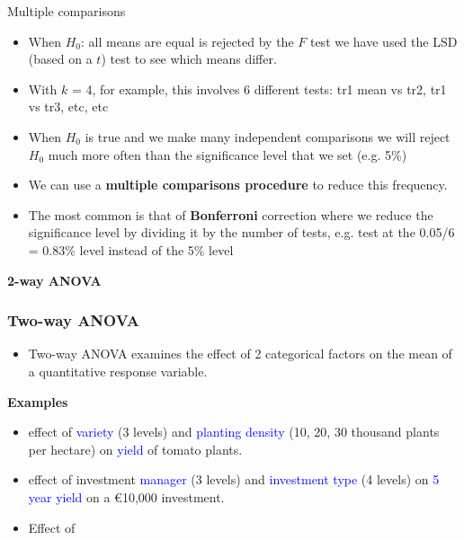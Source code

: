 \documentclass[12pt,xcolor=dvipsnames,handout,mathserif,aspectratio=169]{beamer}
\newcommand{\bbl}[1]{{\color{NavyBlue} \textbf{#1}}}
\newcommand{\bgr}[1]{{\color{PineGreen} \textbf{#1}}}
\newcommand{\tc}{\textcolor}
\begin{document}
\begin{frame}{Multiple comparisons}
\begin{itemize}
\item When $H_0$: all means are equal is rejected by the $F$ test
we have used the LSD (based on a $t$) test to see which means differ.
\vspace{0.2cm}
\item With $k$ = 4, for example, this involves 6 different tests: tr1 mean vs  tr2, tr1 vs tr3, etc, etc
\item When $H_0$ is true and we make many independent comparisons we will reject $H_0$ much more often than the significance level that we set (e.g. 5\%)
\item We can use a \bgr{multiple comparisons procedure} to reduce this frequency.
\item The most common is that of \bbl{Bonferroni} correction where we reduce the significance level by dividing it by the number of tests, e.g. test at the 0.05/6 = 0.83\% level instead of the 5\% level
\end{itemize}
\end{frame}

\begin{frame}
\huge{\bbl{2-way ANOVA}}
\end{frame}

\begin{frame}\frametitle{Two-way ANOVA}
\begin{itemize}
\item Two-way ANOVA examines the effect of 2 categorical factors on the mean of a quantitative response variable.
\end{itemize}
\vspace*{0.5cm}
\textbf{Examples}
\begin{itemize}
\item effect of \tc{blue}{variety} (3 levels) and \tc{blue}{planting density} (10, 20, 30 thousand plants per hectare) on \tc{blue}{yield} of tomato plants.
\vspace{0.5cm}
\item effect of investment \tc{blue}{manager} (3 levels) and \tc{blue}{investment type} (4 levels) on \tc{blue}{5 year yield} on a \euro 10,000 investment.
\item Effect of 
\end{itemize}
\end{frame}
\end{document}
